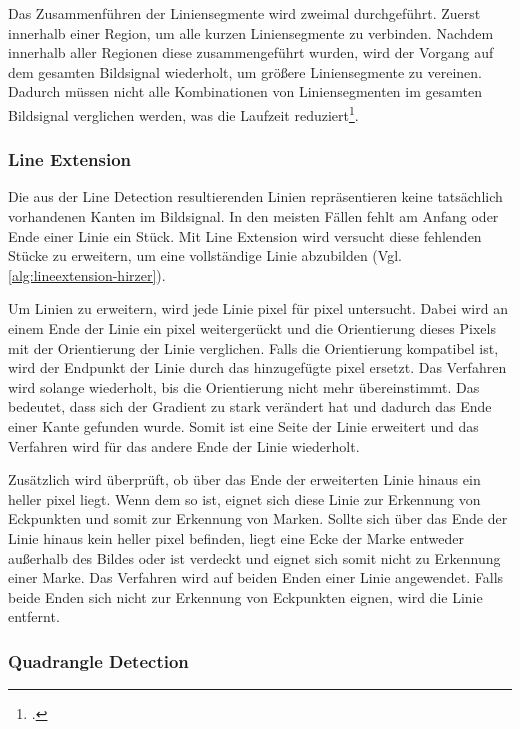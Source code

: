 Das Zusammenführen der Liniensegmente wird zweimal durchgeführt. Zuerst innerhalb einer Region, um alle kurzen
 Liniensegmente zu verbinden. Nachdem innerhalb aller Regionen diese zusammengeführt wurden, wird der Vorgang auf dem
 gesamten Bildsignal wiederholt, um größere Liniensegmente zu vereinen. Dadurch müssen nicht alle
 Kombinationen von Liniensegmenten im gesamten Bildsignal verglichen werden, was die Laufzeit
 reduziert\footcite[Vgl.][S.~10]{hirzer08}.


\subsubsection{Line Extension} %
\label{sub:line_extension}
Die aus der Line Detection resultierenden Linien repräsentieren keine tatsächlich vorhandenen Kanten im Bildsignal. In
 den meisten Fällen fehlt am Anfang oder Ende einer Linie ein Stück. Mit Line Extension wird versucht diese fehlenden
 Stücke zu erweitern, um eine vollständige Linie abzubilden (Vgl. \autoref{alg:lineextension-hirzer}).


Um Linien zu erweitern, wird jede Linie \gls{pixel} für \gls{pixel} untersucht. Dabei wird an einem Ende der Linie
 ein \gls{pixel} weitergerückt und die Orientierung dieses Pixels mit der Orientierung der Linie verglichen. Falls
 die Orientierung kompatibel ist, wird der Endpunkt der Linie durch das hinzugefügte \gls{pixel} ersetzt. Das Verfahren
 wird solange wiederholt, bis die Orientierung nicht mehr übereinstimmt. Das bedeutet, dass sich der Gradient zu stark
 verändert hat und dadurch das Ende einer Kante gefunden wurde. Somit ist eine Seite der Linie erweitert und das
 Verfahren wird für das andere Ende der Linie wiederholt.

Zusätzlich wird überprüft, ob über das Ende der erweiterten Linie hinaus ein heller \gls{pixel} liegt. Wenn dem so ist,
 eignet sich diese Linie zur Erkennung von Eckpunkten und somit zur Erkennung von Marken. Sollte sich über das Ende der
 Linie hinaus kein heller \gls{pixel} befinden, liegt eine Ecke der Marke entweder außerhalb des Bildes oder ist
 verdeckt und eignet sich somit nicht zu Erkennung einer Marke. Das Verfahren wird auf beiden Enden einer Linie
 angewendet. Falls beide Enden sich nicht zur Erkennung von Eckpunkten eignen, wird die Linie entfernt.

\subsubsection{Quadrangle Detection} %
\label{sub:quadrangle_detection}

